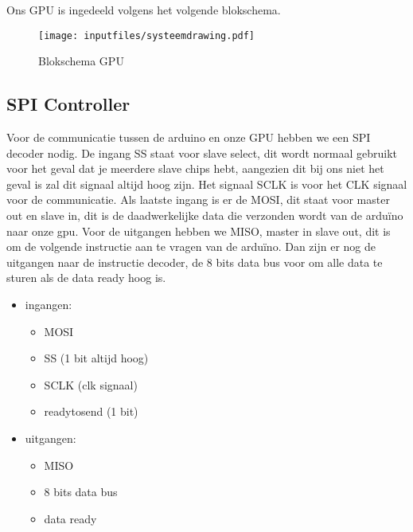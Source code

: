 
Ons GPU is ingedeeld volgens het volgende  blokschema.
\begin{figure}[H]
\centering
        \texttt{[image: inputfiles/systeemdrawing.pdf]}
        \caption{Blokschema GPU}
        \label{fig:Blokschema GPU}
\end{figure}


\subsection{SPI Controller}
Voor de communicatie tussen de arduino en onze GPU hebben we een SPI decoder nodig. De ingang SS staat voor slave select, dit wordt normaal gebruikt voor het geval dat je meerdere slave chips hebt, aangezien dit bij ons niet het geval is zal dit signaal altijd hoog zijn. Het signaal SCLK is voor het CLK signaal voor de communicatie. Als laatste ingang is er de MOSI, dit staat voor master out en slave in, dit is de daadwerkelijke data die verzonden wordt van de arduïno naar onze gpu. Voor de uitgangen hebben we MISO, master in slave out, dit is om de volgende instructie aan te vragen van de arduïno. Dan zijn er nog de uitgangen naar de instructie decoder, de 8 bits data bus voor om alle data te sturen als de data ready hoog is.

\begin {itemize}
\item ingangen:
\begin {itemize}
\item MOSI 
\item SS (1 bit altijd hoog)
\item SCLK (clk signaal)
\item readytosend (1 bit)
\end {itemize}
\item uitgangen:
\begin {itemize}
\item MISO
\item 8 bits data bus
\item data ready
\end {itemize}
\end {itemize}

